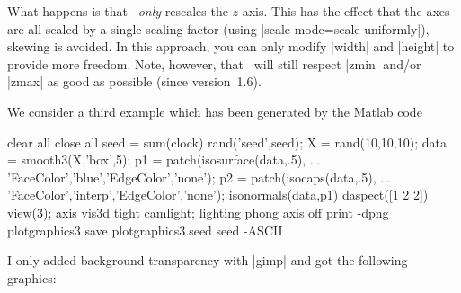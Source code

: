 {{\begin{codeexample}[]
\end{codeexample}
\noindent What happens is that \PGFPlots\ \emph{only} rescales the $z$ axis. This has the effect that the axes are all scaled by a single scaling factor (using |scale mode=scale uniformly|), skewing is avoided. In this approach, you can only modify |width| and |height| to provide more freedom. Note, however, that \PGFPlots\ will still respect |zmin| and/or |zmax| as good as possible (since version~1.6).

We consider a third example which has been generated by the Matlab code
\begin{codeexample}
clear all
close all
seed = sum(clock)
rand('seed',seed);
X = rand(10,10,10);
data = smooth3(X,'box',5);
p1 = patch(isosurface(data,.5), ...
   'FaceColor','blue','EdgeColor','none');
p2 = patch(isocaps(data,.5), ...
    'FaceColor','interp','EdgeColor','none');
isonormals(data,p1)
daspect([1 2 2])
view(3); axis vis3d tight
camlight; lighting phong
axis off
print -dpng plotgraphics3
save  plotgraphics3.seed seed -ASCII %
\end{codeexample}
\noindent I only added background transparency with |gimp| and got the following graphics:

{\setlength{\fboxsep}{0pt}%
\centering
{}%

}}}
